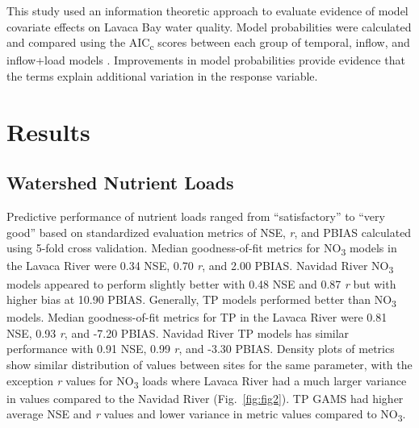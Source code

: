 \documentclass[fleqn,10pt,lineno]{wlpeerj} %
\begin{document}
This study used an information theoretic approach to evaluate evidence
of model covariate effects on Lavaca Bay water quality. Model
probabilities were calculated and compared using the
AIC\textsubscript{c} scores between each group of temporal, inflow, and
inflow+load models \autocite{burnhamAICModelSelection2011}. Improvements
in model probabilities provide evidence that the terms explain
additional variation in the response variable.

\hypertarget{results}{%
\section*{Results}\label{results}}

\hypertarget{watershed-nutrient-loads}{%
\subsection*{Watershed Nutrient Loads}\label{watershed-nutrient-loads}}

Predictive performance of nutrient loads ranged from ``satisfactory'' to
``very good'' based on standardized evaluation metrics of NSE, \emph{r},
and PBIAS \autocite{moriasiHydrologicWaterQuality2015} calculated using
5-fold cross validation. Median goodness-of-fit metrics for
NO\textsubscript{3} models in the Lavaca River were 0.34 NSE, 0.70
\emph{r}, and 2.00 PBIAS. Navidad River NO\textsubscript{3} models
appeared to perform slightly better with 0.48 NSE and 0.87 \emph{r} but
with higher bias at 10.90 PBIAS. Generally, TP models performed better
than NO\textsubscript{3} models. Median goodness-of-fit metrics for TP
in the Lavaca River were 0.81 NSE, 0.93 \emph{r}, and -7.20 PBIAS.
Navidad River TP models has similar performance with 0.91 NSE, 0.99
\emph{r}, and -3.30 PBIAS. Density plots of metrics show similar
distribution of values between sites for the same parameter, with the
exception \emph{r} values for NO\textsubscript{3} loads where Lavaca
River had a much larger variance in values compared to the Navidad River
(Fig.~\ref{fig:fig2}). TP GAMS had higher average NSE and \emph{r}
values and lower variance in metric values compared to
NO\textsubscript{3}.
\end{document}
